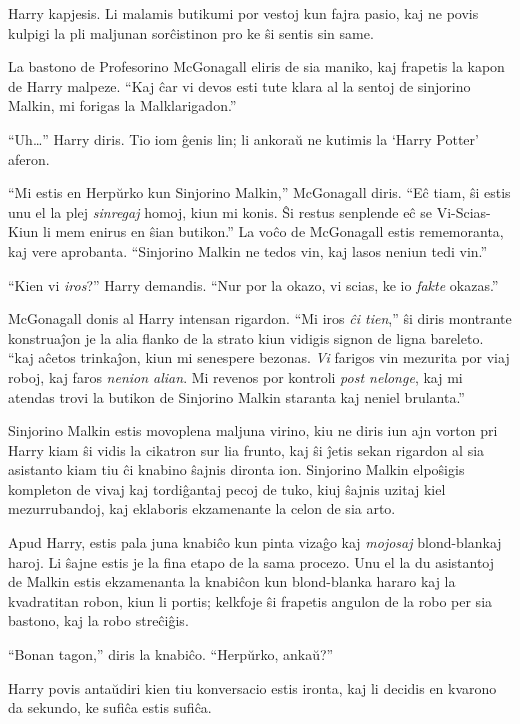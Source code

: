 Harry kapjesis. Li malamis butikumi por vestoj kun fajra pasio, kaj ne
povis kulpigi la pli maljunan sorĉistinon pro ke ŝi sentis sin same.

La bastono de Profesorino McGonagall eliris de sia maniko,
kaj frapetis la kapon de Harry malpeze. ``Kaj ĉar vi devos esti tute klara
al la sentoj de sinjorino Malkin, mi forigas la Malklarigadon.''

``Uh\ldots'' Harry diris. Tio iom ĝenis lin; li ankoraŭ ne kutimis la
‘Harry Potter’ aferon.

``Mi estis en Herpŭrko kun Sinjorino Malkin,'' McGonagall diris. ``Eĉ
tiam, ŝi estis unu el la plej \emph{sinregaj} homoj, kiun mi konis. Ŝi
restus senplende eĉ se Vi-Scias-Kiun li mem enirus en ŝian butikon.''  La
voĉo de McGonagall estis rememoranta, kaj vere aprobanta. ``Sinjorino
Malkin ne tedos vin, kaj lasos neniun tedi vin.''

``Kien vi \emph{iros}?'' Harry demandis. ``Nur por la okazo, vi scias,
ke io \emph{fakte} okazas.''

McGonagall donis al Harry intensan rigardon. ``Mi iros \emph{ĉi
tien},'' ŝi diris montrante konstruaĵon je la alia flanko de la strato
kiun vidigis signon de ligna bareleto. ``kaj aĉetos trinkaĵon, kiun mi
senespere bezonas. \emph{Vi} farigos vin mezurita por viaj roboj,
kaj faros \emph{nenion alian}. Mi revenos por kontroli \emph{post
nelonge}, kaj mi atendas trovi la butikon de Sinjorino Malkin staranta
kaj neniel brulanta.''

Sinjorino Malkin estis movoplena maljuna virino, kiu ne diris iun ajn
vorton pri Harry kiam ŝi vidis la cikatron sur lia frunto, kaj ŝi
ĵetis sekan rigardon al sia asistanto kiam tiu ĉi knabino ŝajnis
dironta ion. Sinjorino Malkin elpoŝigis kompleton de vivaj
kaj tordiĝantaj pecoj de tuko, kiuj ŝajnis uzitaj kiel mezurrubandoj, kaj
eklaboris ekzamenante la celon de sia arto.

Apud Harry, estis pala juna knabiĉo kun pinta vizaĝo kaj
\emph{mojosaj} blond-blankaj haroj. Li ŝajne estis je la fina etapo de
la sama procezo. Unu el la du asistantoj de Malkin estis ekzamenanta
la knabiĉon kun blond-blanka hararo kaj la kvadratitan robon, kiun li
portis; kelkfoje ŝi frapetis angulon de la robo per sia bastono, kaj
la robo streĉiĝis.

``Bonan tagon,'' diris la knabiĉo. ``Herpŭrko, ankaŭ?''

Harry povis antaŭdiri kien tiu konversacio estis ironta, kaj li
decidis en kvarono da sekundo, ke sufiĉa estis sufiĉa.

